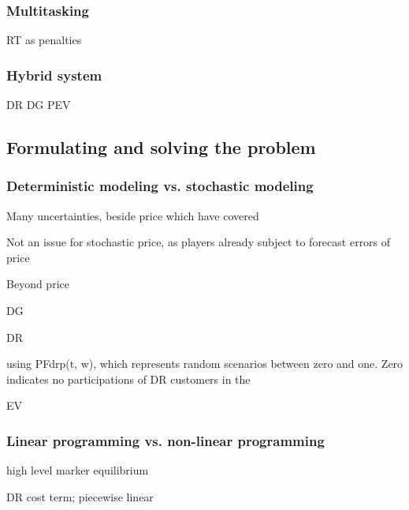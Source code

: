 \subsubsection{Multitasking}

RT as penalties \cite{Xu2017}


\subsubsection{Hybrid system}

DR DG PEV \cite{Xu2017}

\subsection{Formulating and solving the problem}
\label{sec:formulating-solving}
\subsubsection{Deterministic modeling vs. stochastic modeling}

Many uncertainties, beside price which have covered

Not an issue for stochastic price, as players already subject to forecast errors of price

Beyond price

DG
\cite{Zhang2016}

DR

using PFdrp(t, w), which represents random scenarios between zero and one. Zero indicates no participations of DR customers in the

EV
%
\subsubsection{Linear programming vs. non-linear programming}

high level marker equilibrium %
\cite{Mohsenian-Rad2016,HenriquezAuba2017} 

DR cost term; piecewise linear \cite{Mahmoudi2017}



